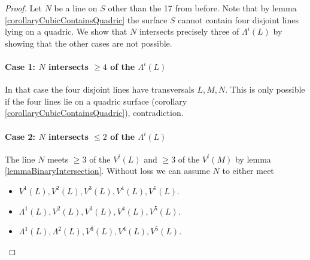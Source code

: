\begin{proof}
Let $N$ be a line on $S$ other than the 17 from before.
Note that by lemma \ref{corollaryCubicContainsQuadric} the surface $S$ cannot contain four disjoint lines lying on a quadric.
We show that $N$ intersects precisely three of $\Lambda^i(L)$ by showing that the other cases are not possible.
\paragraph{Case 1: \textnormal{$N$ intersects $\geq 4$ of the $\Lambda^i(L)$}}
In that case the four disjoint lines have transversals $L,M,N$.
This is only possible if the four lines lie on a quadric surface (corollary \ref{corollaryCubicContainsQuadric}), contradiction.
\paragraph{Case 2: \textnormal{$N$ intersects $\leq 2$ of the $\Lambda^i(L)$}}
The line $N$ meets $\geq 3$ of the $V^i(L)$ and $\geq 3$ of the $V^i(M)$ by lemma \ref{lemmaBinaryIntersection}.
Without loss we can assume $N$ to either meet 
\begin{itemize}
\item $V^1(L) ,V^2(L) ,V^3(L) ,V^4(L) ,V^5(L)$.
\item $\Lambda^1(L),V^2(L),V^3(L) ,V^4(L) ,V^5(L)$.
\item $\Lambda^1(L),\Lambda^2(L), V^3(L) ,V^4(L) ,V^5(L)$.
\end{itemize}

\end{proof}
